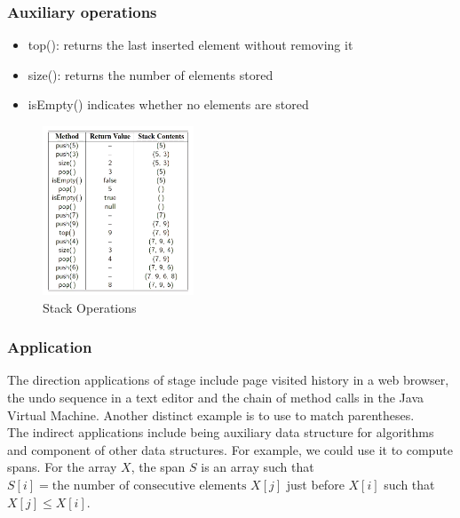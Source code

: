 \documentclass[a4paper]{article}
\theoremstyle{plain}
\theoremstyle{definition}
\newtheorem{exmp}{Example}[section]
\theoremstyle{remark}
\begin{document}
\subsubsection{Auxiliary operations}

\begin{itemize}
	\item top(): returns the last inserted element without removing it
	\item size(): returns the number of elements stored
	\item isEmpty() indicates whether no elements are stored
\end{itemize}
\begin{tcolorbox}[colback=black!3!white,colframe=black!60!white,title=\begin{exmp}Operations of a stack \label{Operations of a stack}\end{exmp}]
\begin{figure}[H]
	\centering
	\includegraphics[width=0.4\textwidth]{figures/stack.png}
	\caption{Stack Operations}
	\label{fig:figures-stack-png}
\end{figure}
\end{tcolorbox}
\subsubsection{Application}
The direction applications of stage include page visited history in a web browser, the undo sequence in a text editor and the chain of method calls in the Java Virtual Machine. Another distinct example is to use to match parentheses. \\
The indirect applications include being auxiliary data structure for algorithms and component of other data structures. For example, we could use it to compute spans. For the array $X$, the span $S$ is an array such that $S[i] = \text{the number of consecutive elements}$ $X[j]$ just before $X[i]$ such that $X[j]\le X[i]$.
\end{document}

